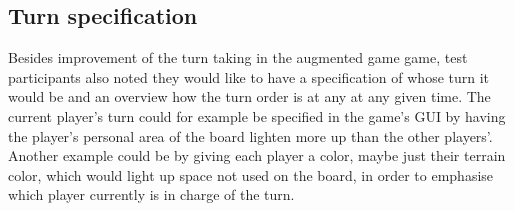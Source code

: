 \subsection{Turn specification}
Besides improvement of the turn taking in the augmented game game, test participants also noted they would like to have a specification of whose turn it would be and an overview how the turn order is at any at any given time. The current player's turn could for example be specified in the game's GUI by having the player's personal area of the board lighten more up than the other players'. Another example could be by giving each player a color, maybe just their terrain color, which would light up space not used on the board, in order to emphasise which player currently is in charge of the turn.






